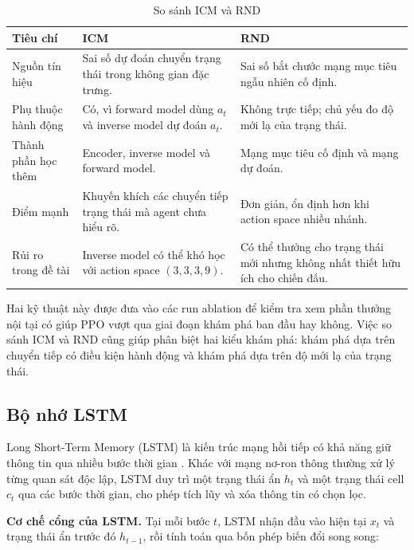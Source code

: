 \begin{table}[H]
    \centering
    \small
    \caption{So sánh ICM và RND}
    \label{tab:icm_rnd_compare}
    \begin{tabular}{|p{3.1cm}|p{5.0cm}|p{5.0cm}|}
        \hline
        \textbf{Tiêu chí} & \textbf{ICM} & \textbf{RND} \\
        \hline
        Nguồn tín hiệu & Sai số dự đoán chuyển trạng thái trong không gian đặc trưng. & Sai số bắt chước mạng mục tiêu ngẫu nhiên cố định. \\
        \hline
        Phụ thuộc hành động & Có, vì forward model dùng $a_t$ và inverse model dự đoán $a_t$. & Không trực tiếp; chủ yếu đo độ mới lạ của trạng thái. \\
        \hline
        Thành phần học thêm & Encoder, inverse model và forward model. & Mạng mục tiêu cố định và mạng dự đoán. \\
        \hline
        Điểm mạnh & Khuyến khích các chuyển tiếp trạng thái mà agent chưa hiểu rõ. & Đơn giản, ổn định hơn khi action space nhiều nhánh. \\
        \hline
        Rủi ro trong đề tài & Inverse model có thể khó học với action space $(3,3,3,9)$. & Có thể thưởng cho trạng thái mới nhưng không nhất thiết hữu ích cho chiến đấu. \\
        \hline
    \end{tabular}
\end{table}

Hai kỹ thuật này được đưa vào các run ablation để kiểm tra xem phần thưởng nội tại có giúp PPO vượt qua giai đoạn khám phá ban đầu hay không. Việc so sánh ICM và RND cũng giúp phân biệt hai kiểu khám phá: khám phá dựa trên chuyển tiếp có điều kiện hành động và khám phá dựa trên độ mới lạ của trạng thái.

\subsection{Bộ nhớ LSTM}

Long Short-Term Memory (LSTM) là kiến trúc mạng hồi tiếp có khả năng giữ thông tin qua nhiều bước thời gian \cite{Hochreiter1997}. Khác với mạng nơ-ron thông thường xử lý từng quan sát độc lập, LSTM duy trì một trạng thái ẩn $h_t$ và một trạng thái cell $c_t$ qua các bước thời gian, cho phép tích lũy và xóa thông tin có chọn lọc.

\textbf{Cơ chế cổng của LSTM.} Tại mỗi bước $t$, LSTM nhận đầu vào hiện tại $x_t$ và trạng thái ẩn trước đó $h_{t-1}$, rồi tính toán qua bốn phép biến đổi song song:

